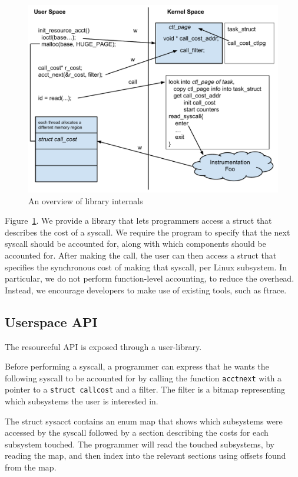 \documentclass[12pt]{article}
\def\_{\textunderscore\-}
\begin{document}
\begin{figure}
  \includegraphics[width=\textwidth]{figures/system-design.pdf}
  \caption{An overview of library internals}
  \label{fig:sysDesign}
\end{figure}


  Figure~\ref{fig:sysDesign}. We provide a library that lets programmers access a struct that describes the cost of a syscall. We require the program to specify that the next syscall should be accounted for, along with which components should be accounted for. After making the call, the user can then access a struct that specifies the synchronous cost of making that syscall, per Linux subsystem. In particular, we do not perform function-level accounting, to reduce the overhead. Instead, we encourage developers to make use of existing tools, such as ftrace.

  \subsection{Userspace API}
  The resourceful API is exposed through a user-library.

  Before performing a syscall, a programmer can express that he wants the following syscall to be accounted for by calling the function \texttt{acct\_next} with a pointer to a \texttt{struct call\_cost} and a filter. The filter is a bitmap representing which subsystems the user is interested in.

  The struct sys\_acct contains an enum map that shows which subsystems were accessed by the syscall followed by a section describing the costs for each subsystem touched. The programmer will read the touched subsystems, by reading the map, and then index into the relevant sections using offsets found from the map.
\end{document}
